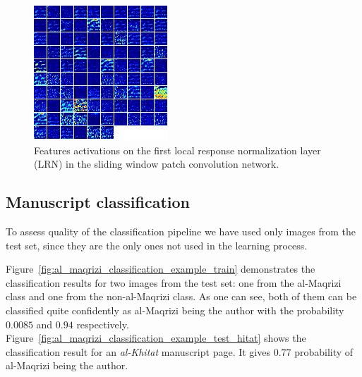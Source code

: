 \documentclass[conference]{IEEEtran}
\begin{document}
\begin{figure}[!b]
	\centering
  	\includegraphics[width=0.75\linewidth]{figures/norm1.png}
	\caption{Features activations on the first local response normalization layer (LRN) in the sliding window patch convolution network.}
  	\label{fig:lrn_activation}
\end{figure}

\subsection{Manuscript classification}

To assess quality of the classification pipeline we have used only images from the test set, since they are the only ones not used in the learning process. 

Figure~\ref{fig:al_maqrizi_classification_example_train} demonstrates the classification results for two images from the test set: one from the al-Maqrizi class and one from the non-al-Maqrizi class. As one can see, both of them can be classified quite confidently as al-Maqrizi being the author with the probability $0.0085$ and $0.94$ respectively. Figure~\ref{fig:al_maqrizi_classification_example_test_hitat} shows the classification result for an {\it al-Khitat} manuscript page. It gives $0.77$ probability of al-Maqrizi being the author.
\end{document}
